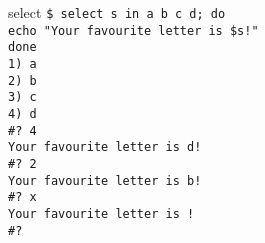 \documentclass{beamer}
\let\tt\texttt
\begin{document}
\begin{frame}{select}
        \tt{\$ select s in a b c d; do}                   \\
        \quad \tt{echo "Your favourite letter is \$s!"}     \\ 
        \tt{done}   \\
        \tt{1) a}   \\
        \tt{2) b}   \\
        \tt{3) c}   \\
        \tt{4) d}   \\
        \tt{\#? 4}  \\
        \tt{Your favourite letter is d!}      \\
        \tt{\#? 2}  \\
        \tt{Your favourite letter is b!}      \\
        \tt{\#? x}  \\
        \tt{Your favourite letter is !}      \\
        \tt{\#? }   \\
\end{frame}
\end{document}
